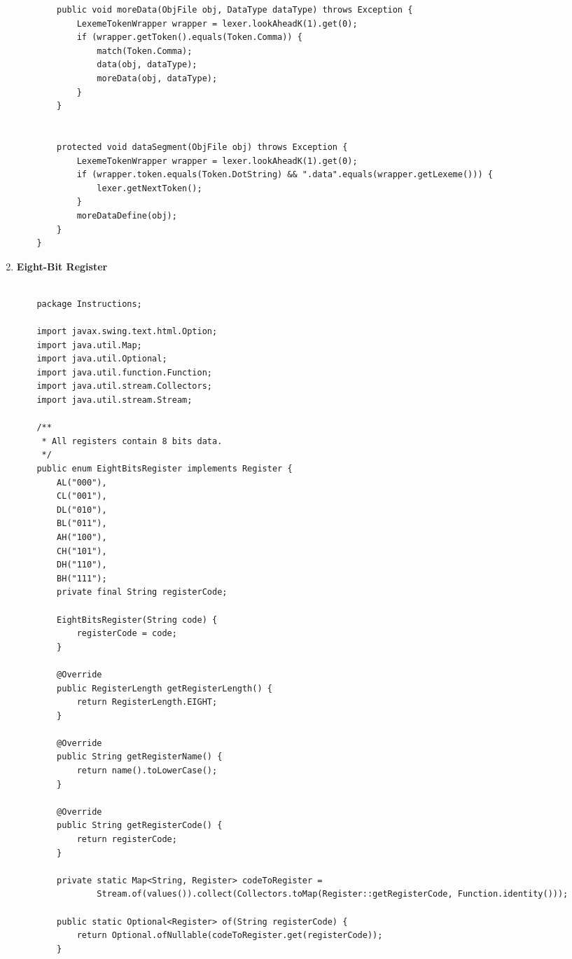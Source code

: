 \documentclass[12pt]{extarticle}
\begin{document}
\begin{enumerate}
\begin{lstlisting}
        public void moreData(ObjFile obj, DataType dataType) throws Exception {
            LexemeTokenWrapper wrapper = lexer.lookAheadK(1).get(0);
            if (wrapper.getToken().equals(Token.Comma)) {
                match(Token.Comma);
                data(obj, dataType);
                moreData(obj, dataType);
            }
        }
    
    
        protected void dataSegment(ObjFile obj) throws Exception {
            LexemeTokenWrapper wrapper = lexer.lookAheadK(1).get(0);
            if (wrapper.token.equals(Token.DotString) && ".data".equals(wrapper.getLexeme())) {
                lexer.getNextToken();
            }
            moreDataDefine(obj);
        }
    }
    \end{lstlisting}
    
    \item\textbf {Eight-Bit Register} \\
    \begin{lstlisting}
    
    package Instructions;
    
    import javax.swing.text.html.Option;
    import java.util.Map;
    import java.util.Optional;
    import java.util.function.Function;
    import java.util.stream.Collectors;
    import java.util.stream.Stream;
    
    /**
     * All registers contain 8 bits data.
     */
    public enum EightBitsRegister implements Register {
        AL("000"),
        CL("001"),
        DL("010"),
        BL("011"),
        AH("100"),
        CH("101"),
        DH("110"),
        BH("111");
        private final String registerCode;
    
        EightBitsRegister(String code) {
            registerCode = code;
        }
    
        @Override
        public RegisterLength getRegisterLength() {
            return RegisterLength.EIGHT;
        }
    
        @Override
        public String getRegisterName() {
            return name().toLowerCase();
        }
    
        @Override
        public String getRegisterCode() {
            return registerCode;
        }
    
        private static Map<String, Register> codeToRegister =
                Stream.of(values()).collect(Collectors.toMap(Register::getRegisterCode, Function.identity()));
    
        public static Optional<Register> of(String registerCode) {
            return Optional.ofNullable(codeToRegister.get(registerCode));
        }
    

\end{lstlisting}
\end{enumerate}
\end{document}
